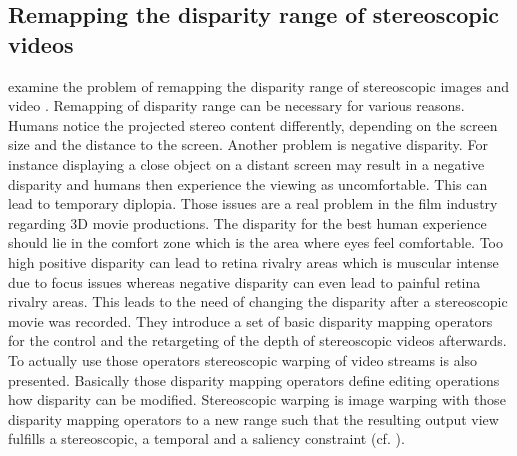 \subsection{Remapping the disparity range of stereoscopic videos}

\citeauthor{lang2010nonlinear} examine the problem of remapping the disparity range of stereoscopic images and video \citep{lang2010nonlinear}.
Remapping of disparity range can be necessary for various reasons.
Humans notice the projected stereo content differently, depending on the screen size and the distance to the screen.
Another problem is negative disparity.
For instance displaying a close object on a distant screen may result in a negative disparity and humans then experience the viewing as uncomfortable.
This can lead to temporary diplopia.
Those issues are a real problem in the film industry regarding 3D movie productions.
The disparity for the best human experience should lie in the comfort zone which is the area where eyes feel comfortable.
Too high positive disparity can lead to retina rivalry areas which is muscular intense due to focus issues whereas negative disparity can even lead to painful retina rivalry areas.
This leads to the need of changing the disparity after a stereoscopic movie was recorded.
They introduce a set of basic disparity mapping operators for the control and the retargeting of the depth of stereoscopic videos afterwards.
To actually use those operators stereoscopic warping of video streams is also presented.
Basically those disparity mapping operators define editing operations how disparity can be modified.
Stereoscopic warping is image warping with those disparity mapping operators to a new range such that the resulting output view fulfills a stereoscopic, a temporal and a saliency constraint (cf. \citep{lang2010nonlinear}).
